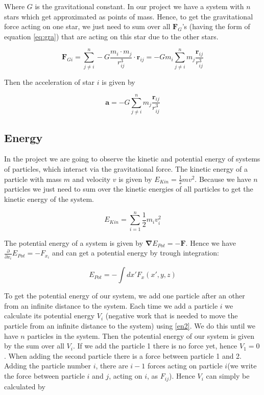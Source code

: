 \documentclass[10pt,a4paper]{article}
\begin{document}
Where $G$ is the gravitational constant. In our project we have a system with $n$ stars which get approximated as points of mass. Hence, to get the gravitational force acting on one star, we just need to sum over all $\mathbf{F}_G$'s (having the form of equation \eqref{eq:gra}) that are acting on this star due to the other stars.

\begin{equation}	
\label{eq:gra2}
\mathbf{F}_{Gi} = \sum_{j \neq i}^{n} - G \frac{m_i \cdot m_j}{r_{ij}^3} \cdot \mathbf{r}_{ij} = - G m_i \sum_{j \neq i}^{n} m_j \frac{\mathbf{r}_{ij}}{r_{ij}^3}
\end{equation}

Then the acceleration of star $i$ is given by

\begin{equation}	
\label{eq:gra3}
\mathbf{a} = - G \sum_{j \neq i}^{n} m_j \frac{\mathbf{r}_{ij}}{r_{ij}^3}
\end{equation}

\subsection{Energy}

In the project we are going to observe the kinetic and potential energy of systems of particles, which interact via the gravitational force. The kinetic energy of a particle with mass $m$ and velocity $v$ is given by $E_{Kin} = \frac{1}{2} m v^2$. Because we have $n$ particles we just need to sum over the kinetic energies of all particles to get the kinetic energy of the system.

\begin{equation}	
\label{en1}
E_{Kin} = \sum_{i = 1}^{n} \frac{1}{2} m_i v_i^2
\end{equation}

The potential energy of a system is given by $\mathbf{\nabla} E_{Pot} = - \mathbf{F}$. Hence we have $\frac{\partial}{\partial x_i}E_{Pot} =- F_{x_i}$ and can get a potential energy by trough integration:

\begin{equation}
\label{en2}
	E_{Pot} = - \int dx' F_{x}(x', y ,z)
\end{equation}

To get the potential energy of our system, we add one particle after an other from an infinite distance to the system. Each time we add a particle $i$ we calculate its potential energy $V_i$ (negative work that is needed to move the particle from an infinite distance to the system) using \eqref{en2}. We do this until we have $n$ particles in the system. Then the potential energy of our system is given by the sum over all $V_i$. If we add the particle 1 there is no force yet, hence $V_1 = 0$. When adding the second particle there is a force between particle 1 and 2. Adding the particle number $i$, there are $i-1$ forces acting on particle $i$(we write the force between particle $i$ and $j$, acting on $i$, as $F_{ij}$). Hence $V_i$ can simply be calculated by
\end{document}
